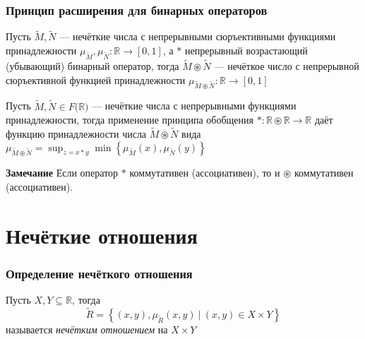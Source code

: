 \documentclass{beamer}
\begin{document}
\begin{frame}\frametitle{Принцип расширения для бинарных операторов}
    \begin{theorem}
        Пусть $\tilde{M}, \tilde{N}$ --- нечёткие числа с непрерывными сюръективными функциями принадлежности $\mu_{\tilde M}, \mu_{\tilde N}: \mathbb{R} \to [0, 1]$, а $*$ непрерывный возрастающий (убывающий) бинарный оператор, тогда $\tilde{M} \circledast \tilde{N}$ --- нечёткое число с непрерывной сюръективной функцией принадлежности $\mu_{\tilde{M} \circledast \tilde{N}}: \mathbb{R} \to [0, 1]$
    \end{theorem}
    
    \begin{theorem}
        Пусть $\tilde{M}, \tilde{N} \in{F(\mathbb{R}})$ --- нечёткие числа с непрерывными функциями принадлежности, тогда применение принципа обобщения $*: \mathbb{R} \circledast \mathbb{R} \to \mathbb{R}$ даёт функцию принадлежности числа $\tilde{M} \circledast \tilde{N}$ вида  $\mu_{\tilde{M} \circledast \tilde{N}} = \sup_{z=x*y}\min{\left\{ \mu_{\tilde{M}}(x), \mu_{\tilde{N}}(y) \right\}}$
    \end{theorem}
    
    \textbf{Замечание} Если оператор $*$ коммутативен (ассоциативен), то и $\circledast$ коммутативен (ассоциативен).
    
\end{frame}

\section{Нечёткие отношения}

\begin{frame}\frametitle{Определение нечёткого отношения}
    \begin{definition}
        Пусть $X, Y \subseteq \mathbb{R}$, тогда
        \[
            \tilde{R} = \left\{(x, y), \mu_{\tilde{R}}(x, y)\ |\ (x,y) \in X \times Y\right\}
        \]
        называется \textit{нечётким отношением} на $X \times Y$
    \end{definition}
    
\end{frame}
\end{document}
